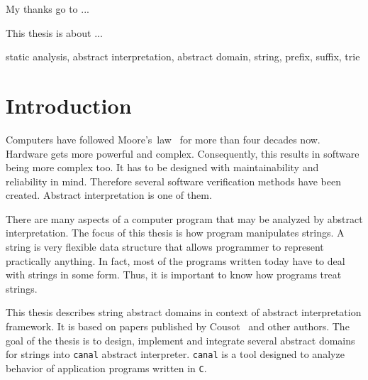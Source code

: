 \documentclass[12pt,final,oneside]{fithesis2}
\newcommand\emptypage{\newpage\null\thispagestyle{empty}\newpage}
\begin{document}
\FrontMatter
\ThesisTitlePage

\emptypage

\begin{ThesisDeclaration}
  \DeclarationText
  \AdvisorName
\end{ThesisDeclaration}

\begin{ThesisThanks}
My thanks go to ...
\end{ThesisThanks}

\begin{ThesisAbstract}
This thesis is about ...
\end{ThesisAbstract}

\begin{ThesisKeyWords}
static analysis, abstract interpretation, abstract domain, string,
prefix, suffix, trie
\end{ThesisKeyWords}

\MainMatter

\tableofcontents


\chapter{Introduction}

Computers have followed Moore's~law~\cite{Moore65-1} for more than
four decades now. Hardware gets more powerful and complex. Consequently,
this results in software being more complex too. It has to be designed
with maintainability and reliability in mind. Therefore several software
verification methods have been created. Abstract interpretation is one
of them.

There are many aspects of a computer program that may be analyzed by
abstract interpretation. The focus of this thesis is how program manipulates
strings. A string is very flexible data structure that allows programmer
to represent practically anything. In fact, most of the programs written
today have to deal with strings in some form. Thus, it is important to know
how programs treat strings.

This thesis describes string abstract domains in context of abstract
interpretation framework. It is based on papers published
by Cousot~\cite{CousotCousot77-1} and other authors. The goal of the thesis
is to design, implement and integrate several abstract domains for strings
into \texttt{canal} abstract interpreter. \texttt{canal} is a tool designed
to analyze behavior of application programs written in \texttt{C}.
\end{document}
